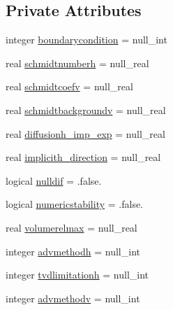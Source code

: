 \subsection*{Private Attributes}
\begin{DoxyCompactItemize}
\item 
integer \mbox{\hyperlink{structmodulerunoffproperties_1_1t__advectiondiffusion_a9d928aba2a1acdbf0038f6e06c94001b}{boundarycondition}} = null\+\_\+int
\item 
real \mbox{\hyperlink{structmodulerunoffproperties_1_1t__advectiondiffusion_a2f326ebebb7173a5f72861d46d1240df}{schmidtnumberh}} = null\+\_\+real
\item 
real \mbox{\hyperlink{structmodulerunoffproperties_1_1t__advectiondiffusion_a4f9ad90a10bc8691c4b188b7ce9b1f00}{schmidtcoefv}} = null\+\_\+real
\item 
real \mbox{\hyperlink{structmodulerunoffproperties_1_1t__advectiondiffusion_a2259ed245e6c7f5b6a102de227c943e7}{schmidtbackgroundv}} = null\+\_\+real
\item 
real \mbox{\hyperlink{structmodulerunoffproperties_1_1t__advectiondiffusion_aacaa8c2a829c36051fbc2d4b2c4bb9df}{diffusionh\+\_\+imp\+\_\+exp}} = null\+\_\+real
\item 
real \mbox{\hyperlink{structmodulerunoffproperties_1_1t__advectiondiffusion_a4742714ad5c006c797f6877d6eecd042}{implicith\+\_\+direction}} = null\+\_\+real
\item 
logical \mbox{\hyperlink{structmodulerunoffproperties_1_1t__advectiondiffusion_a73cd36a31f198ba7372e78b97ec4c28b}{nulldif}} = .false.
\item 
logical \mbox{\hyperlink{structmodulerunoffproperties_1_1t__advectiondiffusion_a4256e8e5d0fdbe2ceec41b24b2a837c7}{numericstability}} = .false.
\item 
real \mbox{\hyperlink{structmodulerunoffproperties_1_1t__advectiondiffusion_a54c04dbe9bef766723a22619b02650b9}{volumerelmax}} = null\+\_\+real
\item 
integer \mbox{\hyperlink{structmodulerunoffproperties_1_1t__advectiondiffusion_a12de3def8a10db7563f459e2b3c2a271}{advmethodh}} = null\+\_\+int
\item 
integer \mbox{\hyperlink{structmodulerunoffproperties_1_1t__advectiondiffusion_a099706be8c8263ddf192b96da67612ba}{tvdlimitationh}} = null\+\_\+int
\item 
integer \mbox{\hyperlink{structmodulerunoffproperties_1_1t__advectiondiffusion_a131e47fa7e890b1e96704caec5c8d84a}{advmethodv}} = null\+\_\+int
\item 

\end{DoxyCompactItemize}
